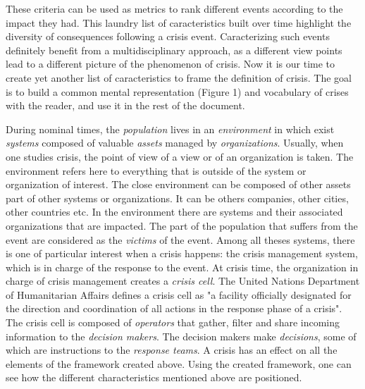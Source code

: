 These criteria can be used as metrics to rank different events according to the impact they had.
This laundry list of caracteristics built over time highlight the diversity of consequences following a crisis event.
Caracterizing such events definitely benefit from a multidisciplinary approach, as a different view points lead to a different picture of the phenomenon of crisis.
Now it is our time to create yet another list of caracteristics to frame the definition of crisis.
The goal is to build a common mental representation (Figure 1) and vocabulary of crises with the reader, and use it in the rest of the document.

During nominal times, the \emph{population} lives in an \emph{environment} in which exist \emph{systems} composed of valuable \emph{assets} managed by \emph{organizations}.
Usually, when one studies crisis, the point of view of a view or of an organization is taken.
The environment refers here to everything that is outside of the system or organization of interest.
The close environment can be composed of other assets part of other systems or organizations.
It can be others companies, other cities, other countries etc.
In the environment there are systems and their associated organizations that are impacted.
The part of the population that suffers from the event are considered as the \emph{victims} of the event.
Among all theses systems, there is one of particular interest when a crisis happens: the crisis management system, which is in charge of the response to the event.
At crisis time, the organization in charge of crisis management creates a \emph{crisis cell}.
The United Nations Department of Humanitarian Affairs defines a crisis cell as "a facility officially designated for the direction and coordination of all actions in the response phase of a crisis".
The crisis cell is composed of \emph{operators} that gather, filter and share incoming information to the \emph{decision makers}.
The decision makers make \emph{decisions}, some of which are instructions to the \emph{response teams}.
A crisis has an effect on all the elements of the framework created above.
Using the created framework, one can see how the different characteristics mentioned above are positioned.

